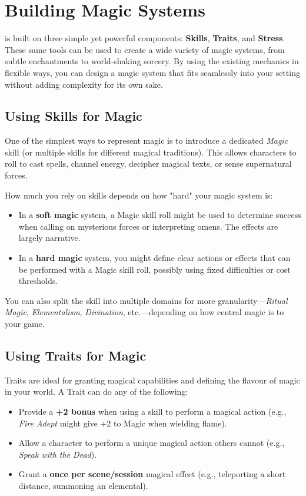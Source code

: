 
\section{Building Magic Systems}

\wyrd is built on three simple yet powerful components: \textbf{Skills}, \textbf{Traits}, and \textbf{Stress}. These same tools can be used to create a wide variety of magic systems, from subtle enchantments to world-shaking sorcery. By using the existing mechanics in flexible ways, you can design a magic system that fits seamlessly into your setting without adding complexity for its own sake.

\subsection*{Using Skills for Magic}

One of the simplest ways to represent magic is to introduce a dedicated \textit{Magic} skill (or multiple skills for different magical traditions). This allows characters to roll to cast spells, channel energy, decipher magical texts, or sense supernatural forces.

How much you rely on skills depends on how "hard" your magic system is:
\begin{itemize}
    \item In a \textbf{soft magic} system, a Magic skill roll might be used to determine success when calling on mysterious forces or interpreting omens. The effects are largely narrative.
    \item In a \textbf{hard magic} system, you might define clear actions or effects that can be performed with a Magic skill roll, possibly using fixed difficulties or cost thresholds.
\end{itemize}

You can also split the skill into multiple domains for more granularity—\textit{Ritual Magic}, \textit{Elementalism}, \textit{Divination}, etc.—depending on how central magic is to your game.

\subsection*{Using Traits for Magic}

Traits are ideal for granting magical capabilities and defining the flavour of magic in your world. A Trait can do any of the following:
\begin{itemize}
    \item Provide a \textbf{+2 bonus} when using a skill to perform a magical action (e.g., \textit{Fire Adept} might give +2 to Magic when wielding flame).
    \item Allow a character to perform a unique magical action others cannot (e.g., \textit{Speak with the Dead}).
    \item Grant a \textbf{once per scene/session} magical effect (e.g., teleporting a short distance, summoning an elemental).
\end{itemize}

